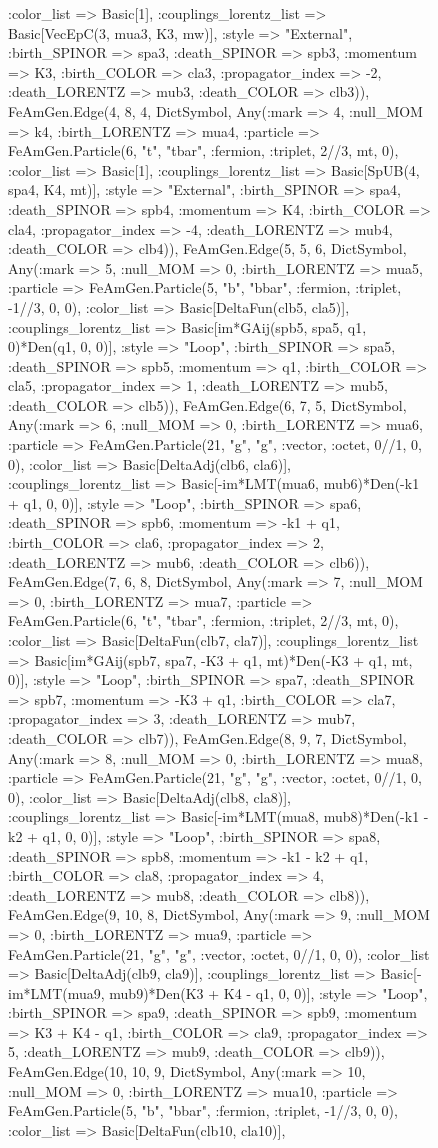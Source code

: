 \documentclass{revtex4}
\begin{document}
\begin{figure}[!htb]
\begin{center}
{:color_list => Basic[1], :couplings_lorentz_list => Basic[VecEpC(3, mua3, K3, mw)], :style => "External", :birth_SPINOR => spa3, :death_SPINOR => spb3, :momentum => K3, :birth_COLOR => cla3, :propagator_index => -2, :death_LORENTZ => mub3, :death_COLOR => clb3)), FeAmGen.Edge(4, 8, 4, Dict{Symbol, Any}(:mark => 4, :null_MOM => k4, :birth_LORENTZ => mua4, :particle => FeAmGen.Particle(6, "t", "tbar", :fermion, :triplet, 2//3, mt, 0), :color_list => Basic[1], :couplings_lorentz_list => Basic[SpUB(4, spa4, K4, mt)], :style => "External", :birth_SPINOR => spa4, :death_SPINOR => spb4, :momentum => K4, :birth_COLOR => cla4, :propagator_index => -4, :death_LORENTZ => mub4, :death_COLOR => clb4)), FeAmGen.Edge(5, 5, 6, Dict{Symbol, Any}(:mark => 5, :null_MOM => 0, :birth_LORENTZ => mua5, :particle => FeAmGen.Particle(5, "b", "bbar", :fermion, :triplet, -1//3, 0, 0), :color_list => Basic[DeltaFun(clb5, cla5)], :couplings_lorentz_list => Basic[im*GAij(spb5, spa5, q1, 0)*Den(q1, 0, 0)], :style => "Loop", :birth_SPINOR => spa5, :death_SPINOR => spb5, :momentum => q1, :birth_COLOR => cla5, :propagator_index => 1, :death_LORENTZ => mub5, :death_COLOR => clb5)), FeAmGen.Edge(6, 7, 5, Dict{Symbol, Any}(:mark => 6, :null_MOM => 0, :birth_LORENTZ => mua6, :particle => FeAmGen.Particle(21, "g", "g", :vector, :octet, 0//1, 0, 0), :color_list => Basic[DeltaAdj(clb6, cla6)], :couplings_lorentz_list => Basic[-im*LMT(mua6, mub6)*Den(-k1 + q1, 0, 0)], :style => "Loop", :birth_SPINOR => spa6, :death_SPINOR => spb6, :momentum => -k1 + q1, :birth_COLOR => cla6, :propagator_index => 2, :death_LORENTZ => mub6, :death_COLOR => clb6)), FeAmGen.Edge(7, 6, 8, Dict{Symbol, Any}(:mark => 7, :null_MOM => 0, :birth_LORENTZ => mua7, :particle => FeAmGen.Particle(6, "t", "tbar", :fermion, :triplet, 2//3, mt, 0), :color_list => Basic[DeltaFun(clb7, cla7)], :couplings_lorentz_list => Basic[im*GAij(spb7, spa7, -K3 + q1, mt)*Den(-K3 + q1, mt, 0)], :style => "Loop", :birth_SPINOR => spa7, :death_SPINOR => spb7, :momentum => -K3 + q1, :birth_COLOR => cla7, :propagator_index => 3, :death_LORENTZ => mub7, :death_COLOR => clb7)), FeAmGen.Edge(8, 9, 7, Dict{Symbol, Any}(:mark => 8, :null_MOM => 0, :birth_LORENTZ => mua8, :particle => FeAmGen.Particle(21, "g", "g", :vector, :octet, 0//1, 0, 0), :color_list => Basic[DeltaAdj(clb8, cla8)], :couplings_lorentz_list => Basic[-im*LMT(mua8, mub8)*Den(-k1 - k2 + q1, 0, 0)], :style => "Loop", :birth_SPINOR => spa8, :death_SPINOR => spb8, :momentum => -k1 - k2 + q1, :birth_COLOR => cla8, :propagator_index => 4, :death_LORENTZ => mub8, :death_COLOR => clb8)), FeAmGen.Edge(9, 10, 8, Dict{Symbol, Any}(:mark => 9, :null_MOM => 0, :birth_LORENTZ => mua9, :particle => FeAmGen.Particle(21, "g", "g", :vector, :octet, 0//1, 0, 0), :color_list => Basic[DeltaAdj(clb9, cla9)], :couplings_lorentz_list => Basic[-im*LMT(mua9, mub9)*Den(K3 + K4 - q1, 0, 0)], :style => "Loop", :birth_SPINOR => spa9, :death_SPINOR => spb9, :momentum => K3 + K4 - q1, :birth_COLOR => cla9, :propagator_index => 5, :death_LORENTZ => mub9, :death_COLOR => clb9)), FeAmGen.Edge(10, 10, 9, Dict{Symbol, Any}(:mark => 10, :null_MOM => 0, :birth_LORENTZ => mua10, :particle => FeAmGen.Particle(5, "b", "bbar", :fermion, :triplet, -1//3, 0, 0), :color_list => Basic[DeltaFun(clb10, cla10)], }
\end{center}
\end{figure}
\end{document}
